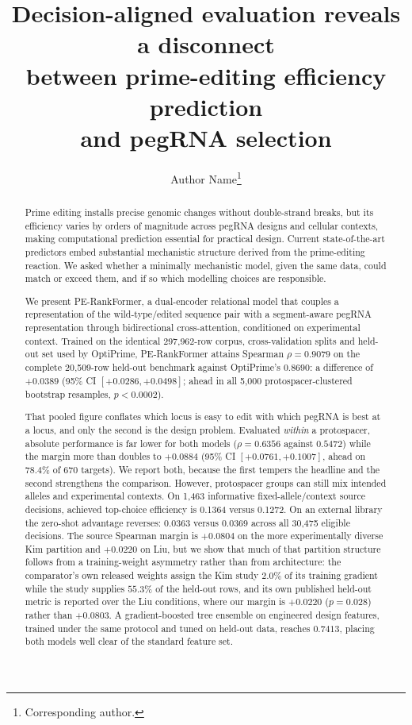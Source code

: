 \documentclass[11pt]{article}
\title{\textbf{Decision-aligned evaluation reveals a disconnect\\
between prime-editing efficiency prediction\\
and pegRNA selection}}
\author[1]{Author Name\thanks{Corresponding author.}}
\affil[1]{University of California, Irvine}
\date{}
\begin{document}
\maketitle

\begin{abstract}
\noindent
Prime editing installs precise genomic changes without double-strand breaks, but its
efficiency varies by orders of magnitude across pegRNA designs and cellular contexts,
making computational prediction essential for practical design. Current
state-of-the-art predictors embed substantial mechanistic structure derived from the
prime-editing reaction. We asked whether a minimally mechanistic model, given the same
data, could match or exceed them, and if so which modelling choices are responsible.

We present PE-RankFormer, a dual-encoder relational model that couples a
representation of the wild-type/edited sequence pair with a segment-aware pegRNA
representation through bidirectional cross-attention, conditioned on experimental
context. Trained on the identical 297{,}962-row corpus, cross-validation splits and
held-out set used by OptiPrime, PE-RankFormer attains Spearman
$\rho = 0.9079$ on the complete 20{,}509-row held-out benchmark against OptiPrime's
$0.8690$: a difference of $+0.0389$ (95\% CI $[+0.0286,+0.0498]$; ahead in all 5{,}000
protospacer-clustered bootstrap resamples, $p < 0.0002$).

That pooled figure conflates which locus is easy to edit with which pegRNA is best at a
locus, and only the second is the design problem. Evaluated \emph{within} a protospacer,
absolute performance is far lower for both models
($\rho = 0.6356$ against $0.5472$) while the margin more than doubles to $+0.0884$
(95\% CI $[+0.0761,+0.1007]$, ahead on $78.4\%$ of 670 targets). We report both, because
the first tempers the headline and the second strengthens the comparison. However,
protospacer groups can still mix intended alleles and experimental contexts. On
1{,}463 informative fixed-allele/context source decisions, achieved top-choice
efficiency is 0.1364 versus 0.1272. On an external library the zero-shot advantage
reverses: 0.0363 versus 0.0369 across all 30{,}475 eligible decisions. The source
Spearman margin is $+0.0804$ on the more
experimentally diverse Kim partition and $+0.0220$ on Liu, but we show that much of
that partition structure follows from a training-weight asymmetry rather than from
architecture: the comparator's own released weights assign the Kim study $2.0\%$ of its
training gradient while the study supplies $55.3\%$ of the held-out rows, and its own
published held-out metric is reported over the Liu conditions, where our margin is
$+0.0220$ ($p=0.028$) rather than $+0.0803$. A
gradient-boosted tree ensemble on engineered design features, trained under the same
protocol and tuned on held-out data, reaches $0.7413$, placing both models well clear of
the standard feature set.


\end{abstract}
\end{document}
